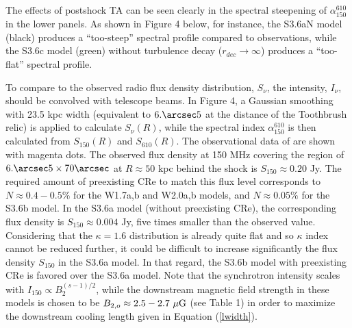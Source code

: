 \documentclass[twocolumn]{aastex61}
\def\muG{~{\mu\rm G}}
\begin{document}
The effects of postshock TA can be seen clearly in the spectral steepening 
of $\alpha_{150}^{610}$ in the lower panels.
As shown in Figure 4 below, for instance, the S3.6aN model (black) produces a ``too-steep'' spectral profile compared to observations,
while the S3.6c model (green) without turbulence decay ($r_{dec} \rightarrow\infty$) produces a ``too-flat'' spectral profile.

To compare to the observed radio flux density distribution, $S_{\nu}$, the intensity, $I_{\nu}$, should be convolved with telescope beams.
In Figure 4, a Gaussian smoothing with 23.5 kpc width 
(equivalent to $6.\arcsec5$ at the distance of the Toothbrush relic) 
is applied to calculate $S_{\nu} (R)$,
while the spectral index $\alpha_{150}^{610}$ is then calculated from $S_{150} (R)$ and $S_{610} (R)$.
The observational data of \citet{vanweeren16} are shown with magenta dots.
The observed flux density at 150 MHz covering the region of $6.\arcsec5 \times 70\arcsec$ 
at $R\approx 50$ kpc behind the shock is $S_{150}\approx 0.20$ Jy.
The required amount of preexisting CRe to match this flux level corresponds to $N\approx 0.4-0.5 \%$ 
for the W1.7a,b and W2.0a,b models, and $N\approx0.05\%$ for the S3.6b model.
In the S3.6a model (without preexisting CRe), the corresponding flux density is $S_{150}\approx 0.004$ Jy,
five times smaller than the observed value.
Considering that the $\kappa=1.6$ distribution is already quite flat and so $\kappa$ index cannot be 
reduced further, it could be difficult to increase significantly the flux density $S_{150}$ in the S3.6a model.
In that regard, the S3.6b model with preexisting CRe is favored over the S3.6a model.
Note that the synchrotron intensity scales with $I_{150}\propto B_2^{(s-1)/2}$, 
while the downstream magnetic field strength in these models is chosen to be $B_{2,o}\approx 2.5-2.7\muG$ 
(see Table 1) in order to maximize the downstream cooling length given in Equation (\ref{lwidth}).
\end{document}
